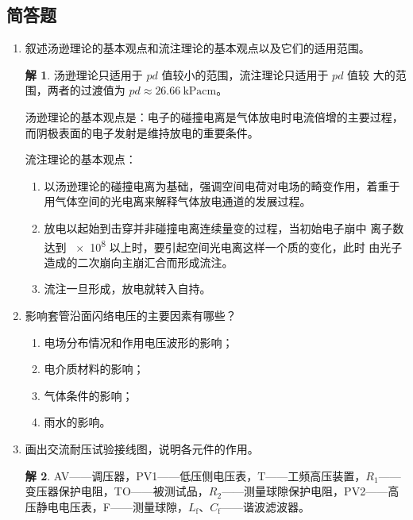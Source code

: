 \documentclass[zihao=-4,fontset = none]{ctexart}
\theoremstyle{definition}
\newtheorem*{solution}{解}
\begin{document}
\subsection{简答题}
\begin{enumerate}
  \item 叙述汤逊理论的基本观点和流注理论的基本观点以及它们的适用范围。
  \begin{solution}
    汤逊理论只适用于 $pd$ 值较小的范围，流注理论只适用于 $pd$ 值较
    大的范围，两者的过渡值为 $pd \approx \SI{26.66}{\kPa \cm}$。

    汤逊理论的基本观点是：电子的碰撞电离是气体放电时电流倍增的主要过程，而阴极表面的电子发射是维持放电的重要条件。

    流注理论的基本观点：
    \begin{enumerate}
      \item 以汤逊理论的碰撞电离为基础，强调空间电荷对电场的畸变作用，着重于用气体空间的光电离来解释气体放电通道的发展过程。
      \item 放电以起始到击穿并非碰撞电离连续量变的过程，当初始电子崩中
      离子数达到 \num{e8} 以上时，要引起空间光电离这样一个质的变化，此时
      由光子造成的二次崩向主崩汇合而形成流注。
      \item 流注一旦形成，放电就转入自持。
    \end{enumerate}
  \end{solution}
  \item 影响套管沿面闪络电压的主要因素有哪些？
  \begin{enumerate}
    \item 电场分布情况和作用电压波形的影响；
    \item 电介质材料的影响；
    \item 气体条件的影响；
    \item 雨水的影响。
  \end{enumerate}
  \item \label{ti:2-3}画出交流耐压试验接线图，说明各元件的作用。
  \begin{solution}
    AV——调压器，PV1——低压侧电压表，T——工频高压装置，$R_1$——变压器保护电阻，TO——被测试品，$R_2$——测量球隙保护电阻，PV2——高压静电电压表，F——测量球隙，$L_{\mathrm{f}}$、$C_{\mathrm{f}}$——谐波滤波器。

\end{solution}
\end{enumerate}
\end{document}
